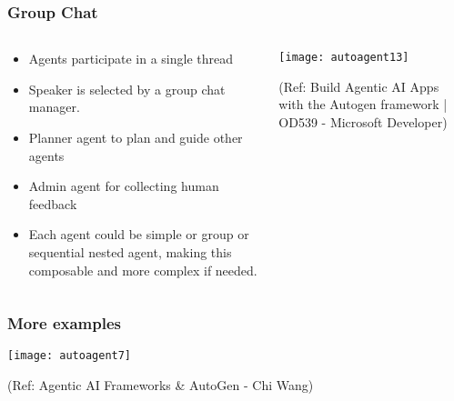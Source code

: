   
\begin{frame}[fragile]\frametitle{Group Chat}

\begin{columns}
    \begin{column}[T]{0.6\linewidth}

		  \begin{itemize}
		  \item Agents participate in a single thread
		  \item Speaker is selected by a group chat manager.
		  \item Planner agent to plan and guide other agents
		  \item Admin agent for collecting human feedback
		  \item Each agent could be simple or group or sequential nested agent, making this composable and more complex if needed.
		  \end{itemize}

    \end{column}
    \begin{column}[T]{0.4\linewidth}

		\begin{center}
		\texttt{[image: autoagent13]}
		\end{center}
	
	  {\tiny (Ref: Build Agentic AI Apps with the Autogen framework | OD539 - Microsoft Developer)}

    \end{column}
  \end{columns}
  
\end{frame}
  



\begin{frame}[fragile]\frametitle{More examples}
		\begin{center}
		\texttt{[image: autoagent7]}
		\end{center}
		
		{\tiny (Ref: Agentic AI Frameworks \& AutoGen - Chi Wang)}
\end{frame}
  
